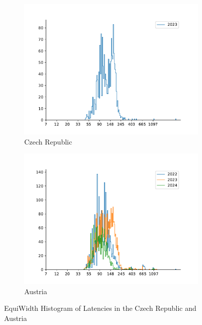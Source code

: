 \begin{figure}
	\centering
	\begin{subfigure}[b]{0.8\linewidth}
		\includegraphics[width=\linewidth]{chapters/4-results/latency/img/histogram_of_latencies_of_starlink_probes_in_czechia.pdf}
		\caption{Czech Republic}
	\end{subfigure}
	\begin{subfigure}[b]{0.8\linewidth}
		\includegraphics[width=\linewidth]{chapters/4-results/latency/img/histogram_of_latencies_of_starlink_probes_in_austria.pdf}
		\caption{Austria}
	\end{subfigure}
	\caption{EquiWidth Histogram of Latencies in the Czech Republic and
		Austria}
	\label{fig:latency-histogram-6}
\end{figure}

